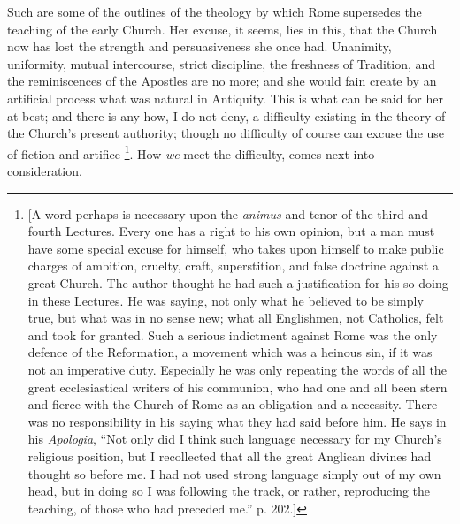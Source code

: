 Such are some of the outlines of the theology by which Rome
supersedes the teaching of the early Church. Her excuse, it seems,
lies in this, that the Church now has lost the strength and
persuasiveness she once had. Unanimity, uniformity, mutual
intercourse, strict discipline, the freshness of Tradition, and
the reminiscences of the Apostles are no more; and she would fain
create by an artificial process what was natural in Antiquity. This is
what can be said for her at best; and there is any how, I do not deny,
a difficulty existing in the theory of the Church's present authority;
though no difficulty of course can excuse the use of fiction and
artifice \footnote{[A word perhaps is necessary upon the \emph{animus}
and tenor of the third and fourth Lectures. Every one has a right to
his own opinion, but a man must have some special excuse for himself,
who takes upon himself to make public charges of ambition, cruelty,
craft, superstition, and false doctrine against a great Church. The
author thought he had such a justification for his so doing in these
Lectures. He was saying, not only what he believed to be simply true,
but what was in no sense new; what all Englishmen, not Catholics, felt
and took for granted. Such a serious indictment against Rome was the
only defence of the Reformation, a movement which was a heinous sin,
if it was not an imperative duty. Especially he was only repeating the
words of all the great ecclesiastical writers of his communion, who
had one and all been stern and fierce with the Church of Rome as an
obligation and a necessity. There was no responsibility in his saying
what they had said before him. He says in his \emph{Apologia},
``Not only did I think such language necessary for my Church's
religious position, but I recollected that all the great Anglican
divines had thought so before me. I had not used strong language
simply out of my own head, but in doing so I was following the track,
or rather, reproducing the teaching, of those who had preceded
me.'' p. 202.]}. How \emph{we}
meet the difficulty, comes next into consideration.


